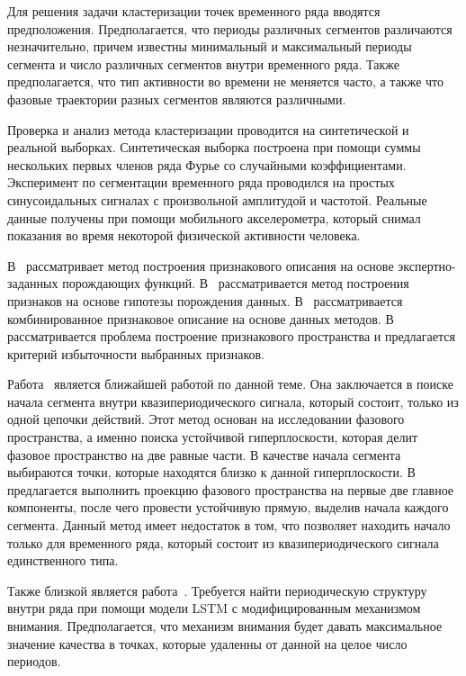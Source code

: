 Для решения задачи кластеризации точек временного ряда вводятся предположения. 
Предполагается, что периоды различных сегментов различаются незначительно, причем известны минимальный и максимальный периоды сегмента и число различных сегментов внутри временного ряда. 
Также предполагается, что тип активности во времени не меняется часто, а также что фазовые траектории разных сегментов являются различными. 

Проверка и анализ метода кластеризации проводится на синтетической и реальной выборках.
Синтетическая выборка построена при помощи суммы нескольких первых членов ряда Фурье со случайными коэффициентами.
Эксперимент по сегментации временного ряда проводился на простых синусоидальных сигналах с произвольной амплитудой и частотой. 
Реальные данные получены при помощи мобильного акселерометра, который снимал показания во время некоторой физической активности человека. 

В~\cite{kwapisz2010} рассматривает метод построения признакового описания на основе экспертно-заданных порождающих функций.
В~\cite{lukashin2003} рассматривается метод построения признаков на основе гипотезы порождения данных. 
В~\cite{Ivkin2015} рассматривается комбинированное признаковое описание на основе данных методов. 
В~\cite{Katrutsa2015} рассматривается проблема построение признакового пространства и предлагается критерий избыточности выбранных признаков.

Работа~\cite{motrenko2015} является ближайшей работой по данной теме. Она заключается в поиске начала сегмента внутри квазипериодического сигнала, который состоит, только из одной цепочки действий. Этот метод основан на исследовании фазового пространства, а именно поиска устойчивой гиперплоскости, которая делит фазовое пространство на две равные части. В качестве начала сегмента выбираются точки, которые находятся близко к данной гиперплоскости. В~\cite{motrenko2015} предлагается выполнить проекцию фазового пространства на первые две главное компоненты, после чего провести устойчивую прямую, выделив начала каждого сегмента. 
Данный метод имеет недостаток в том, что позволяет находить начало только для временного ряда, который состоит из квазипериодического сигнала единственного типа.


Также близкой является работа~\cite{cinar2018}. Требуется найти периодическую структуру внутри ряда при помощи модели LSTM с модифицированным механизмом внимания. Предполагается, что механизм внимания будет давать максимальное значение качества в точках, которые удаленны от данной на целое число периодов.

